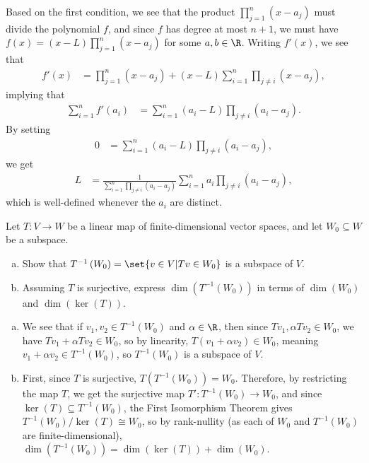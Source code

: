 \documentclass[10pt]{mypackage}
\begin{document}
\begin{solution}
  Based on the first condition, we see that the product $\prod_{j=1}^{n}\left( x-a_j \right)$ must divide the polynomial $f$, and since $f$ has degree at most $n+1$, we must have $f(x) = \left( x-L \right)\prod_{j=1}^{n} \left( x-a_j \right)$ for some $a,b\in \R$. Writing $f'(x)$, we see that
  \begin{align*}
    f'(x) &= \prod_{j=1}^{n}\left( x-a_j \right) + \left( x-L \right)\sum_{i=1}^{n} \prod_{j\neq i}\left( x-a_j \right),
  \end{align*}
  implying that
  \begin{align*}
    \sum_{i=1}^{n}f'\left( a_i \right) &= \sum_{i=1}^{n} \left( a_i - L \right) \prod_{j\neq i} \left( a_i - a_j \right). 
  \end{align*}
  By setting
  \begin{align*}
    0 &= \sum_{i=1}^{n} \left( a_i - L \right) \prod_{j\neq i} \left( a_i - a_j \right),
  \end{align*}
  we get
  \begin{align*}
    L &= \frac{1}{\sum_{i=1}^{n}\prod_{j\neq i}\left( a_i - a_j \right)} \sum_{i=1}^{n} a_i \prod_{j\neq i} \left( a_i - a_j \right),
  \end{align*}
  which is well-defined whenever the $a_i$ are distinct.
\end{solution}
\begin{problem}[Problem 3]
  Let $T\colon V\rightarrow W$ be a linear map of finite-dimensional vector spaces, and let $W_0\subseteq W$ be a subspace.
  \begin{enumerate}[(a)]
    \item Show that $T^{-1}\left( W_0 \right) = \set{v\in V | Tv\in W_0}$ is a subspace of $V$.
    \item Assuming $T$ is surjective, express $\dim \left( T^{-1}\left( W_0 \right) \right)$ in terms of $\dim\left( W_0 \right)$ and $\dim\left( \ker\left( T \right) \right)$.
  \end{enumerate}
\end{problem}
\begin{solution}\hfill
  \begin{enumerate}[(a)]
    \item We see that if $v_1,v_2\in T^{-1}\left( W_0 \right)$ and $\alpha\in\R$, then since $Tv_1,\alpha Tv_2\in W_0$, we have $Tv_1 + \alpha Tv_2 \in W_0$, so by linearity, $T\left( v_1 + \alpha v_2 \right)\in W_0$, meaning $v_1 + \alpha v_2\in T^{-1}\left( W_0 \right)$, so $T^{-1}\left( W_0 \right)$ is a subspace of $V$.
    \item First, since $T$ is surjective, $T\left( T^{-1}\left( W_0 \right) \right) = W_0$. Therefore, by restricting the map $T$, we get the surjective map $T'\colon T^{-1}\left( W_0 \right)\rightarrow W_0$, and since $\ker\left( T \right)\subseteq T^{-1}\left( W_0 \right)$, the First Isomorphism Theorem gives $T^{-1}\left( W_0 \right)/\ker\left( T \right)\cong W_0$, so by rank-nullity (as each of $W_0$ and $T^{-1}\left( W_0 \right)$ are finite-dimensional), $\dim\left( T^{-1}\left( W_0 \right) \right) = \dim\left( \ker\left( T \right) \right) + \dim\left( W_0 \right)$.
  \end{enumerate}
\end{solution}
\end{document}

